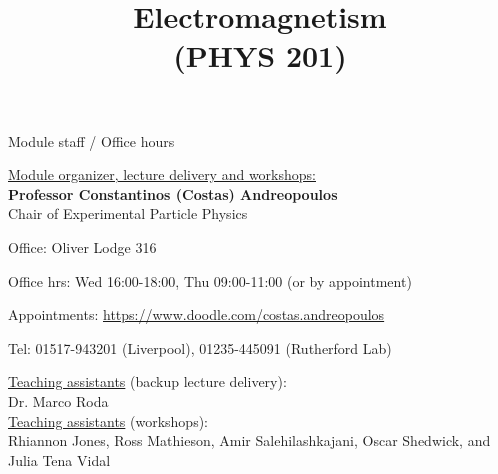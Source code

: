 \renewcommand{\prevlecture}{0}
\renewcommand{\thislecture}{0}
\renewcommand{\nextlecture}{1}

%
%

\title[PHYS 201]
{
  \Huge{Electromagnetism}\\(PHYS 201)\\
}



\begin{frame}[plain]
  \titlepage
\end{frame}


%
%

\begin{frame}{Module staff / Office hours}

\underline{Module organizer, lecture delivery and workshops:}\\
\vspace{0.3cm}
{\bf Professor Constantinos (Costas) Andreopoulos}\\
Chair of Experimental Particle Physics
\vspace{0.2cm}
\begin{itemize}
{\small
 \item Office: Oliver Lodge 316
 \item Office hrs: Wed 16:00-18:00, Thu 09:00-11:00 (or by appointment)
 \item Appointments: {\color{blue} \url{https://www.doodle.com/costas.andreopoulos}}
 \item Tel: 01517-943201 (Liverpool), 01235-445091 (Rutherford Lab)
}
\end{itemize}

\vspace{0.1cm}
\underline{Teaching assistants} (backup lecture delivery):\\
Dr. Marco Roda\\

\vspace{0.2cm}
\underline{Teaching assistants} (workshops):\\
Rhiannon Jones,
Ross Mathieson,
Amir Salehilashkajani,
Oscar Shedwick, and
Julia Tena Vidal\\

\end{frame}

%
%

